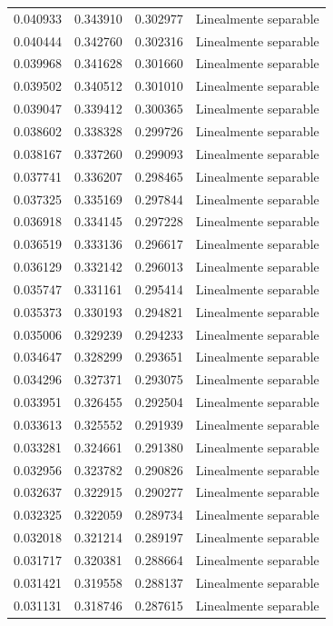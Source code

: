 \begin{tabular}{llll}
0.040933 & 0.343910 & 0.302977 & Linealmente separable \\
0.040444 & 0.342760 & 0.302316 & Linealmente separable \\
0.039968 & 0.341628 & 0.301660 & Linealmente separable \\
0.039502 & 0.340512 & 0.301010 & Linealmente separable \\
0.039047 & 0.339412 & 0.300365 & Linealmente separable \\
0.038602 & 0.338328 & 0.299726 & Linealmente separable \\
0.038167 & 0.337260 & 0.299093 & Linealmente separable \\
0.037741 & 0.336207 & 0.298465 & Linealmente separable \\
0.037325 & 0.335169 & 0.297844 & Linealmente separable \\
0.036918 & 0.334145 & 0.297228 & Linealmente separable \\
0.036519 & 0.333136 & 0.296617 & Linealmente separable \\
0.036129 & 0.332142 & 0.296013 & Linealmente separable \\
0.035747 & 0.331161 & 0.295414 & Linealmente separable \\
0.035373 & 0.330193 & 0.294821 & Linealmente separable \\
0.035006 & 0.329239 & 0.294233 & Linealmente separable \\
0.034647 & 0.328299 & 0.293651 & Linealmente separable \\
0.034296 & 0.327371 & 0.293075 & Linealmente separable \\
0.033951 & 0.326455 & 0.292504 & Linealmente separable \\
0.033613 & 0.325552 & 0.291939 & Linealmente separable \\
0.033281 & 0.324661 & 0.291380 & Linealmente separable \\
0.032956 & 0.323782 & 0.290826 & Linealmente separable \\
0.032637 & 0.322915 & 0.290277 & Linealmente separable \\
0.032325 & 0.322059 & 0.289734 & Linealmente separable \\
0.032018 & 0.321214 & 0.289197 & Linealmente separable \\
0.031717 & 0.320381 & 0.288664 & Linealmente separable \\
0.031421 & 0.319558 & 0.288137 & Linealmente separable \\
0.031131 & 0.318746 & 0.287615 & Linealmente separable \\

\end{tabular}
